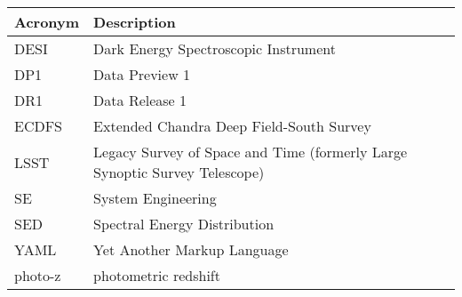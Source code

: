 \addtocounter{table}{-1}
\begin{longtable}{p{}p{}}\hline
\textbf{Acronym} & \textbf{Description}  \\\hline

DESI & Dark Energy Spectroscopic Instrument \\\hline
DP1 & Data Preview 1 \\\hline
DR1 & Data Release 1 \\\hline
ECDFS & Extended Chandra Deep Field-South Survey \\\hline
LSST & Legacy Survey of Space and Time (formerly Large Synoptic Survey Telescope) \\\hline
SE & System Engineering \\\hline
SED & Spectral Energy Distribution \\\hline
YAML & Yet Another Markup Language \\\hline
photo-z & photometric redshift \\\hline
\end{longtable}
